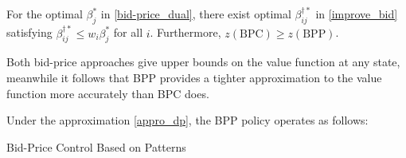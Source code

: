 \begin{lem}\label{BPC_relation}
    For the optimal $\beta_{j}^{*}$ in \eqref{bid-price_dual}, there exist optimal $\beta_{ij}^{\dag *}$ in \eqref{improve_bid} satisfying $\beta_{ij}^{\dag *} \leq w_{i} \beta_{j}^{*}$ for all $i$. Furthermore, $z(\text{BPC}) \geq z(\text{BPP})$.
\end{lem}
    
    
Both bid-price approaches give upper bounds on the value function at any state, meanwhile it follows that BPP provides a tighter approximation to the value function more accurately than BPC does.

Under the approximation \eqref{appro_dp}, the BPP policy operates as follows:



\begin{algorithm}[H]
    \caption{Bid-Price Control Based on Patterns}\label{algo_improve_bid}
\end{algorithm}




